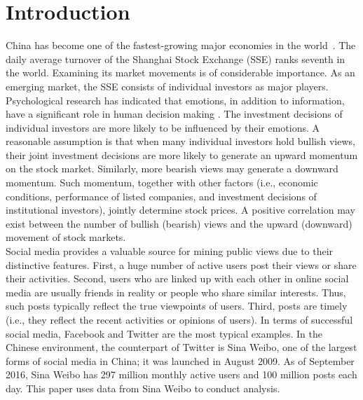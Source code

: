 \documentclass[review,3p,times,12pt,number]{elsarticle}
\begin{document}
\section{Introduction}
China has become one of the fastest-growing major economies in the world~\cite{bruche2011new}. The daily average turnover of the Shanghai Stock Exchange (SSE) ranks seventh in the world. Examining its market movements is of considerable importance. As an emerging market, the SSE consists of individual investors as major players. Psychological research has indicated that emotions, in addition to information, have a significant role in human decision making \cite{Dolan2002}. The investment decisions of individual investors are more likely to be influenced by their emotions. A reasonable assumption is that when many individual investors hold bullish views, their joint investment decisions are more likely to generate an upward momentum on the stock market. Similarly, more bearish views may generate a downward momentum. Such momentum, together with other factors (i.e., economic conditions, performance of listed companies, and investment decisions of institutional investors), jointly determine stock prices. A positive correlation may exist between the number of bullish (bearish) views and the upward (downward) movement of stock markets.\\
\indent
Social media provides a valuable source for mining public views due to their distinctive features. First, a huge number of active users post their views or share their activities. Second, users who are linked up with each other in online social media are usually friends in reality or people who share similar interests. Thus, such posts typically reflect the true viewpoints of users. Third, posts are timely (i.e., they reflect the recent activities or opinions of users). In terms of successful social media, Facebook and Twitter are the most typical examples. In the Chinese environment, the counterpart of Twitter is Sina Weibo, one of the largest forms of social media in China; it was launched in August 2009. As of September 2016, Sina Weibo has 297 million monthly active users and 100 million posts each day. This paper uses data from Sina Weibo to conduct analysis.\\
\indent
\end{document}
